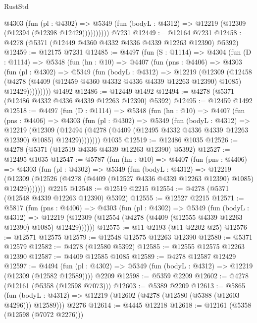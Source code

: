 \begin{lexlean}{RustStd}
\begin{coremodule}
{\begin{coremodule}
{{{{{{{{{{{{{{{{{{{{{{{{{{{{{{{{{{{            @4303
              (fun (pl : @4302) =>
              @5349 (fun (bodyL : @4312) => @12219 (@12309 (@12394 (@12398 @12429))))))))))
    @7231
@12449 := @12164 @7231
@12458 := @4278 (@5371 (@12449 @4360 @4332 @4336 @4339 @12263 @12390) @5392)
@12459 := @12175 @7231
@12485 := @4497
    (fun (S : @1114) =>
    @4304
      (fun (D : @1114) =>
      @5348
        (fun (hn : @10) =>
        @4407
          (fun (pns : @4406) =>
          @4303
            (fun (pl : @4302) =>
            @5349
              (fun (bodyL : @4312) =>
              @12219
                (@12309
                  (@12458
                    (@4278
                      (@4409 (@12459 @4360 @4332 @4336 @4339 @12263 @12390) @1085)
                      @12429)))))))))
    @1492
@12486 := @12449 @1492
@12494 := @4278 (@5371 (@12486 @4332 @4336 @4339 @12263 @12390) @5392)
@12495 := @12459 @1492
@12518 := @4497
    (fun (D : @1114) =>
    @5348
      (fun (hn : @10) =>
      @4407
        (fun (pns : @4406) =>
        @4303
          (fun (pl : @4302) =>
          @5349
            (fun (bodyL : @4312) =>
            @12219
              (@12309
                (@12494 (@4278 (@4409 (@12495 @4332 @4336 @4339 @12263 @12390) @1085) @12429))))))))
    @1035
@12519 := @12486 @1035
@12526 := @4278 (@5371 (@12519 @4336 @4339 @12263 @12390) @5392)
@12527 := @12495 @1035
@12547 := @5787
    (fun (hn : @10) =>
    @4407
      (fun (pns : @4406) =>
      @4303
        (fun (pl : @4302) =>
        @5349
          (fun (bodyL : @4312) =>
          @12219
            (@12309 (@12526 (@4278 (@4409 (@12527 @4336 @4339 @12263 @12390) @1085) @12429)))))))
    @2215
@12548 := @12519 @2215
@12554 := @4278 (@5371 (@12548 @4339 @12263 @12390) @5392)
@12555 := @12527 @2215
@12571 := @5817
    (fun (pns : @4406) =>
    @4303
      (fun (pl : @4302) =>
      @5349
        (fun (bodyL : @4312) =>
        @12219 (@12309 (@12554 (@4278 (@4409 (@12555 @4339 @12263 @12390) @1085) @12429))))))
@12575 := @11 @2193 (@11 @2202 @25)
@12576 := @12571 @12575
@12579 := @12548 @12575 @12263 @12390
@12580 := @5371 @12579
@12582 := @4278 (@12580 @5392)
@12585 := @12555 @12575 @12263 @12390
@12587 := @4409 @12585 @1085
@12589 := @4278 @12587 @12429
@12597 := @4494
    (fun (pl : @4302) => @5349 (fun (bodyL : @4312) => @12219 (@12309 (@12582 @12589))))
    @2209
@12598 := @5359 @2209
@12602 := @4278 (@12161 (@5358 (@12598 @7073)))
@12603 := @5389 @2209
@12613 := @5865
    (fun (bodyL : @4312) => @12219 (@12602 (@4278 (@12580 (@5388 (@12603 @4296))) @12589)))
    @2276
@12614 := @4445 @12218
@12618 := @12161 (@5358 (@12598 (@7072 @2276)))
}}}}}}}}}}}}}}}}}}}}}}}}}}}}}}}}}}}
\end{coremodule}}
\end{coremodule}
\end{lexlean}
